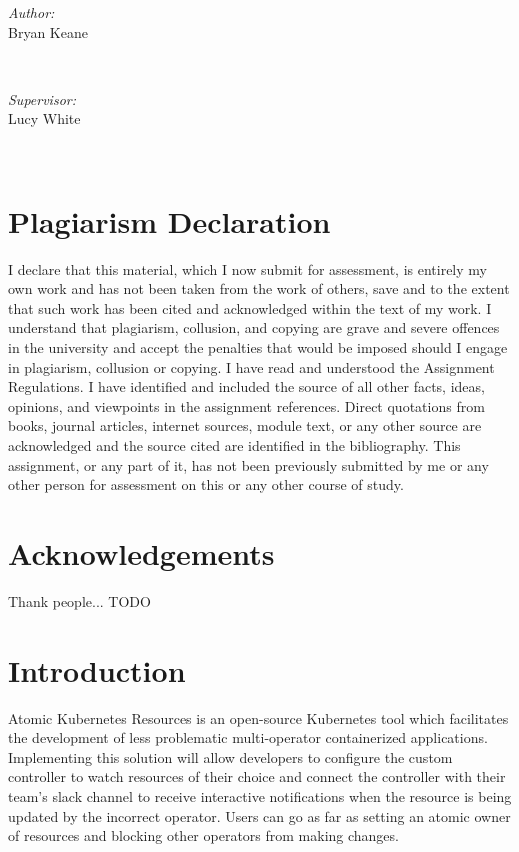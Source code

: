 \documentclass{article}
\begin{document}
\begin{titlepage}
    \begin{minipage}{0.4\textwidth}
    \begin{flushleft} \large
    \emph{Author:}\\
    Bryan Keane 
    \end{flushleft}
    \end{minipage}
    ~
    \begin{minipage}{0.4\textwidth}
    \begin{flushright} \large
    \emph{Supervisor:} \\
    Lucy White
    \end{flushright}
    \end{minipage}\\[2cm]
    
    \end{titlepage}

\newpage

\tableofcontents
\newpage

\listoffigures
\newpage

\listoftables
\newpage

\section{Plagiarism Declaration}
I declare that this material, which I now submit for assessment, is entirely my
own work and has not been taken from the work of others, save and to the extent that such
work has been cited and acknowledged within the text of my work. I understand
that plagiarism, collusion, and copying are grave and severe offences in the university and
accept the penalties that would be imposed should I engage in plagiarism, collusion or
copying. I have read and understood the Assignment Regulations. I have identified
and included the source of all other facts, ideas, opinions, and viewpoints in the
assignment references. Direct quotations from books, journal articles, internet sources,
module text, or any other source are acknowledged and the source cited are
identified in the bibliography. This assignment, or any part of it, has not been
previously submitted by me or any other person for assessment on this or any other
course of study. 


\section{Acknowledgements}
Thank people... TODO

\section{Introduction}
Atomic Kubernetes Resources is an open-source Kubernetes tool which facilitates the 
development of less problematic multi-operator containerized applications. 
Implementing this solution will allow developers to configure the custom controller 
to watch resources of their choice and connect the controller with their team’s slack 
channel to receive interactive notifications when the resource is being updated by the 
incorrect operator. Users can go as far as setting an atomic owner of resources and blocking 
other operators from making changes.
\end{document}
